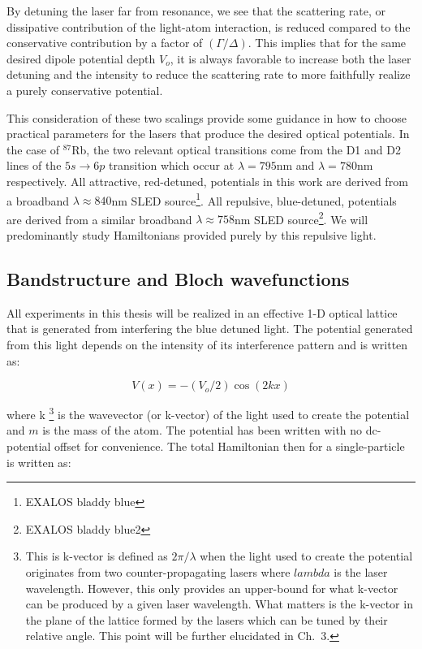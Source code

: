 By detuning the laser far from resonance, we see that the scattering rate, or dissipative contribution of the light-atom interaction, is reduced compared to the conservative contribution by a factor of $(\Gamma/\Delta)$. This implies that for the same desired dipole potential depth $V_o$, it is always favorable to increase both the laser detuning and the intensity to reduce the scattering rate to more faithfully realize a purely conservative potential. 

This consideration of these two scalings provide some guidance in how to choose practical parameters for the lasers that produce the desired optical potentials. In the case of $^{87}$Rb, the two relevant optical transitions come from the D1 and D2 lines of the $5s\rightarrow6p$ transition which occur at $\lambda=795$nm and $\lambda=780$nm respectively. All attractive, red-detuned, potentials in this work are derived from a broadband $\lambda\approx840$nm SLED source\footnote{EXALOS bladdy blue}. All repulsive, blue-detuned, potentials are derived from a similar broadband $\lambda\approx758$nm SLED source\footnote{EXALOS bladdy blue2}. We will predominantly study Hamiltonians provided purely by this repulsive light.

\subsection{Bandstructure and Bloch wavefunctions}

All experiments in this thesis will be realized in an effective 1-D optical lattice that is generated from interfering the blue detuned light. The potential generated from this light depends on the intensity of its interference pattern and is written as:


\begin{equation}
\label{eqn:Vpot}
V(x)=-(V_o/2) \cos{\left  (  2 k x \right )}
\end{equation}

where k \footnote{This is k-vector is defined as $2\pi/\lambda$ when the light used to create the potential originates from two counter-propagating lasers where $lambda$ is the laser wavelength. However, this only provides an upper-bound for what k-vector can be produced by a given laser wavelength. What matters is the k-vector in the plane of the lattice formed by the lasers which can be tuned by their relative angle. This point will be further elucidated in Ch.~3.} is the wavevector (or k-vector) of the light used to create the potential and $m$ is the mass of the atom. The potential has been written with no dc-potential offset for convenience. The total Hamiltonian then for a single-particle is written as:

